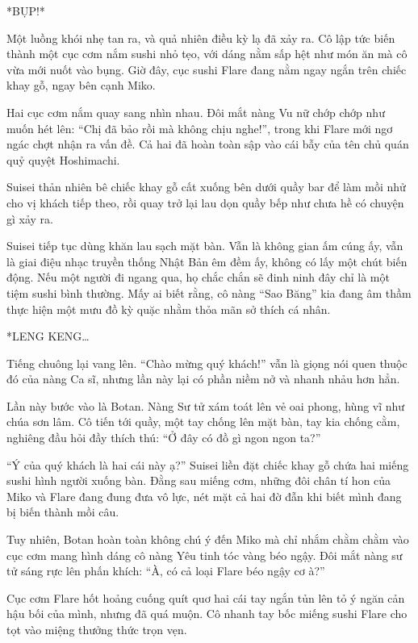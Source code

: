 \documentclass[../main.tex]{subfiles}
\begin{document}
*BỤP!*

Một luồng khói nhẹ tan ra, và quả nhiên điều kỳ lạ đã xảy ra. Cô lập tức biến thành một cục cơm nắm sushi nhỏ tẹo, với dáng nằm sấp hệt như món ăn mà cô vừa mới nuốt vào bụng. Giờ đây, cục sushi Flare đang nằm ngay ngắn trên chiếc khay gỗ, ngay bên cạnh Miko.


Hai cục cơm nắm quay sang nhìn nhau. Đôi mắt nàng Vu nữ chớp chớp như muốn hét lên: ``Chị đã bảo rồi mà không chịu nghe!'', trong khi Flare mới ngơ ngác chợt nhận ra vấn đề. Cả hai đã hoàn toàn sập vào cái bẫy của tên chủ quán quỷ quyệt Hoshimachi.

Suisei thản nhiên bê chiếc khay gỗ cất xuống bên dưới quầy bar để làm mồi nhử cho vị khách tiếp theo, rồi quay trở lại lau dọn quầy bếp như chưa hề có chuyện gì xảy ra.

\ct

Suisei tiếp tục dùng khăn lau sạch mặt bàn. Vẫn là không gian ấm cúng ấy, vẫn là giai điệu nhạc truyền thống Nhật Bản êm đềm ấy, không có lấy một chút biến động. Nếu một người đi ngang qua, họ chắc chắn sẽ đinh ninh đây chỉ là một tiệm sushi bình thường. Mấy ai biết rằng, cô nàng ``Sao Băng'' kia đang âm thầm thực hiện một mưu đồ kỳ quặc nhằm thỏa mãn sở thích cá nhân.

*LENG KENG\dots*

Tiếng chuông lại vang lên. ``Chào mừng quý khách!'' vẫn là giọng nói quen thuộc đó của nàng Ca sĩ, nhưng lần này lại có phần niềm nở và nhanh nhảu hơn hẳn.

Lần này bước vào là Botan. Nàng Sư tử xám toát lên vẻ oai phong, hùng vĩ như chúa sơn lâm. Cô tiến tới quầy, một tay chống lên mặt bàn, tay kia chống cằm, nghiêng đầu hỏi đầy thích thú: ``Ở đây có đồ gì ngon ngon ta?''


``Ý của quý khách là hai cái này ạ?'' Suisei liền đặt chiếc khay gỗ chứa hai miếng sushi hình người xuống bàn. Đằng sau miếng cơm, những đôi chân tí hon của Miko và Flare đang đung đưa vô lực, nét mặt cả hai đờ đẫn khi biết mình đang bị biến thành mồi câu.

Tuy nhiên, Botan hoàn toàn không chú ý đến Miko mà chỉ nhắm chằm chằm vào cục cơm mang hình dáng cô nàng Yêu tinh tóc vàng béo ngậy. Đôi mắt nàng sư tử sáng rực lên phấn khích: ``À, có cả loại Flare béo ngậy cơ à?''

Cục cơm Flare hốt hoảng cuống quít quơ hai cái tay ngắn tủn lên tỏ ý ngăn cản hậu bối của mình, nhưng đã quá muộn. Cô nhanh tay bốc miếng sushi Flare cho tọt vào miệng thưởng thức trọn vẹn.
\end{document}

